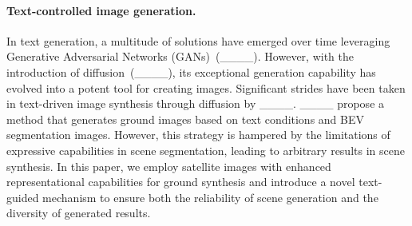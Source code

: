 \paragraph{Text-controlled image generation.} In text generation, a multitude of solutions have emerged over time leveraging Generative Adversarial Networks (GANs)~(____). However, with the introduction of diffusion~(____), its exceptional generation capability has evolved into a potent tool for creating images. Signiﬁcant strides have been taken in text-driven image synthesis through diffusion by ____. ____ propose a method that generates ground images based on text conditions and BEV segmentation images. However, this strategy is hampered by the limitations of expressive capabilities in scene segmentation, leading to arbitrary results in scene synthesis. In this paper, we employ satellite images with enhanced representational capabilities for ground synthesis and introduce a novel text-guided mechanism to ensure both the reliability of scene generation and the diversity of generated results.